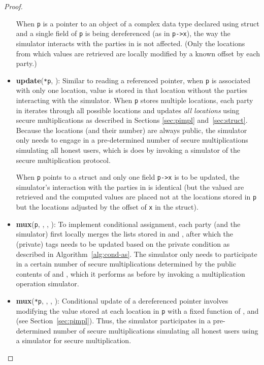 \documentclass[11pt]{article}
\begin{document}
\begin{proof}
\begin{itemize}
    When \texttt{p} is a pointer to an object of a complex data type
    declared using struct and a single field of \texttt{p} is being
    dereferenced (as in \texttt{p->x}), the way the simulator interacts with
    the parties in  is not affected. (Only the locations from which
    values are retrieved are locally modified by a known offset by each
    party.)
    
  \item \textbf{update}(\texttt{*p}, ): Similar to reading a referenced
    pointer, when \texttt{p} is associated with only one location, value 
    is stored in that location without the parties interacting with the
    simulator. When \texttt{p} stores multiple locations, each party in 
    iterates through all possible locations and updates \emph{all locations}
    using secure multiplications as described in Sections \ref{sec:pimpl}
    and~\ref{sec:struct}. Because the locations (and their number) are
    always public, the simulator only needs to engage in a pre-determined
    number of secure multiplications simulating all honest users, which is
    does by invoking a simulator of the secure multiplication protocol.
    
    When \texttt{p} points to a struct and only one field \texttt{p->x} is
    to be updated, the simulator's interaction with the parties in  is
    identical (but the valued are retrieved and the computed values are
    placed not at the locations stored in \texttt{p} but the locations
    adjusted by the offset of \texttt{x} in the struct).
    
  \item \textbf{mux}(\texttt{p}, , , ): To implement
    conditional assignment, each party (and the simulator) first locally
    merges the lists stored in  and , after which the (private)
    tags needs to be updated based on the private condition  as
    described in Algorithm~\ref{alg:cond-as}. The simulator only needs to
    participate in a certain number of secure multiplications determined by
    the public contents of  and , which it performs as before
    by invoking a multiplication operation simulator.
    
  \item \textbf{mux}(\texttt{*p}, , , ): Conditional update
    of a dereferenced pointer involves modifying the value stored at each
    location in \texttt{p} with a fixed function of ,  and 
    (see Section~\ref{sec:pimpl}). Thus, the simulator participates in a
    pre-determined number of secure multiplications simulating all honest
    users using a simulator for secure multiplication.
    

\end{itemize}
\end{proof}
\end{document}
